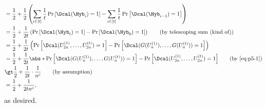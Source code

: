 \begin{answer}
\begin{align*}
        &= \frac{1}{2}+\frac{1}{2}\left(\sum_{i\in [t]} \frac{1}{t} \Pr\left[ \Dcal(\Hyb_{i})  =1\right]
        -  \sum_{i\in [t]} \frac{1}{t} \Pr\left[   \Dcal(\Hyb_{i-1})  =1\right]\right)\\
        &= \frac{1}{2}+\frac{1}{2t}\left( \Pr\left[ \Dcal(\Hyb_{t})  =1\right]
        -   \Pr\left[   \Dcal(\Hyb_{0})  =1\right]\right)
        \qquad \textrm{(by telescoping sum (kind of))}\\
        &= \frac{1}{2}+\frac{1}{2t}\left( \Pr\left[ \Dcal(U_{2n}^{(1)},\ldots,U_{2n}^{(t)})  =1\right]
        -   \Pr\left[   \Dcal(G(U_n^{(1)}),\ldots,G(U_n^{(t)}))  =1\right]\right)\\
        &= \frac{1}{2}+\frac{1}{2t}\abs*{\Pr\left[   \Dcal(G(U_n^{(1)}),\ldots,G(U_n^{(t)}))  =1\right] - \Pr\left[ \Dcal(U_{2n}^{(1)},\ldots,U_{2n}^{(t)})  =1\right] }
        \qquad \textrm{(by \eqref{eq:p5-1})}\\
        &\gt  \frac{1}{2}+\frac{1}{2t} \cdot \frac{1}{n^c} 
        \qquad \textrm{(by assumption)}\\
        &= \frac{1}{2}+\frac{1}{2tn^c},
    \end{align*}
    as desired.
\end{answer}